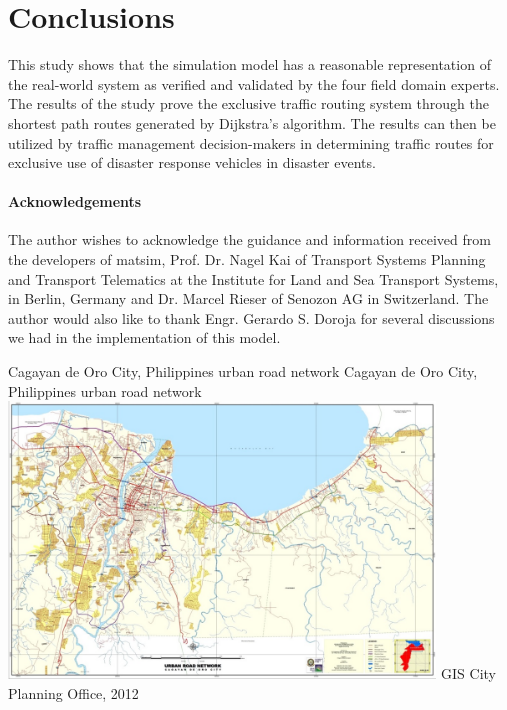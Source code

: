\section{Conclusions}
This study shows that the simulation model has a reasonable representation of the real-world system as verified and validated by the four field domain experts. The results of the study prove the exclusive traffic routing system through the shortest path routes generated by Dijkstra’s algorithm. The results can then be utilized by traffic management decision-makers in determining traffic routes for exclusive use of disaster response vehicles in disaster events.

\paragraph{Acknowledgements}
The author wishes to acknowledge the guidance and information received from the developers of \gls{matsim}, Prof. Dr. Nagel Kai of Transport Systems Planning and Transport Telematics at the Institute for Land and Sea Transport Systems, in Berlin, Germany and Dr. Marcel Rieser of Senozon AG in Switzerland. The author would also like to thank Engr. Gerardo S. Doroja for several discussions we had in the implementation of this model.

\createfigure%
{Cagayan de Oro City, Philippines urban road network}%
{Cagayan de Oro City, Philippines urban road network}%
{\label{fig:philippines_fig1}}%
{\includegraphics[width=0.85\textwidth, angle=0]{./using/figures/philippines_fig1.png}}%
{GIS City Planning Office, 2012}

